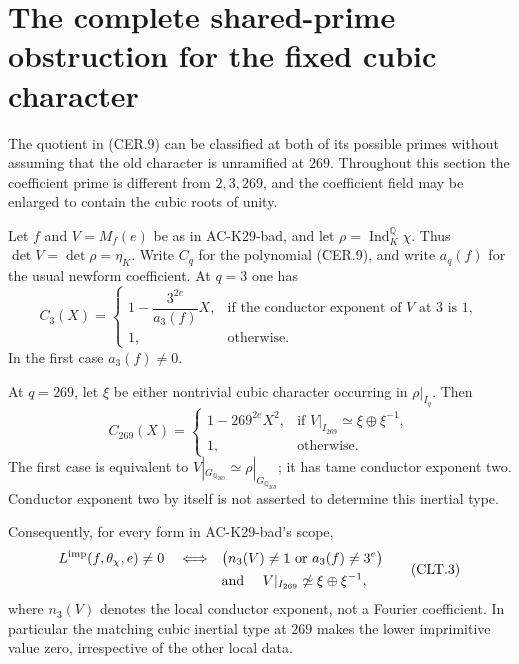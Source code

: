 \section{The complete shared-prime obstruction for the fixed cubic character}
\label{sec:cubic-shared-local-types}

The quotient in (CER.9) can be classified at both of its
possible primes without assuming that the old character is
unramified at $269$.  Throughout this section the coefficient
prime is different from $2,3,269$, and the coefficient field
may be enlarged to contain the cubic roots of unity.

\begin{proposition}
\label{AC-K29-local-types}
Let $f$ and $V=M_f(e)$ be as in AC-K29-bad, and let
$\rho=\operatorname{Ind}_K^{\mathbb Q}\chi$.
Thus $\det V=\det\rho=\eta_K$.
Write $C_q$ for the polynomial (CER.9), and write
$a_q(f)$ for the usual newform coefficient.
At $q=3$ one has
\[
 C_3(X)=
 \begin{cases}
  1-\dfrac{3^{2e}}{a_3(f)}X,
       &\text{if the conductor exponent of $V$ at $3$ is $1$},\\[5pt]
  1,&\text{otherwise}.
 \end{cases}                                                   \tag{CLT.1}
\]
In the first case $a_3(f)\ne0$.

At $q=269$, let $\xi$ be either nontrivial cubic character
occurring in $\rho|_{I_q}$.  Then
\[
 C_{269}(X)=
 \begin{cases}
  1-269^{2e}X^2,
       &\text{if }V|_{I_{269}}\simeq\xi\oplus\xi^{-1},\\
  1,&\text{otherwise}.
 \end{cases}                                                   \tag{CLT.2}
\]
The first case is equivalent to
$V|_{G_{\mathbb Q_{269}}}\simeq\rho|_{G_{\mathbb Q_{269}}}$;
it has tame conductor exponent two.  Conductor exponent
two by itself is not asserted to determine this inertial
type.

Consequently, for every form in AC-K29-bad's scope,
\[
 \begin{split}
 L^{\rm imp}(f,\theta_\chi,e)\ne0
 \quad\Longleftrightarrow\quad&
 \bigl(n_3(V)\ne1\ \text{or}\ a_3(f)\ne3^e\bigr)\\
 &\text{and }\quad
 V|_{I_{269}}\not\simeq\xi\oplus\xi^{-1},
 \end{split}                                                   \tag{CLT.3}
\]
where $n_3(V)$ denotes the local conductor exponent, not a
Fourier coefficient.  In particular the matching cubic
inertial type at $269$ makes the lower imprimitive value
zero, irrespective of the other local data.
\end{proposition}
